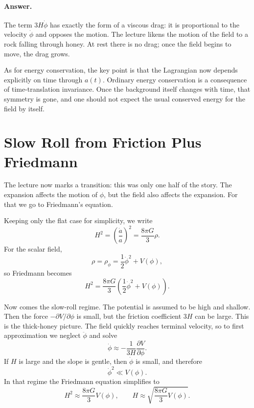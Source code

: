 \paragraph{Answer.} The term \(3H\dot{\phi}\) has exactly the form of a viscous drag: it is proportional to the velocity \(\dot{\phi}\) and opposes the motion. The lecture likens the motion of the field to a rock falling through honey. At rest there is no drag; once the field begins to move, the drag grows.

As for energy conservation, the key point is that the Lagrangian now depends explicitly on time through \(a(t)\). Ordinary energy conservation is a consequence of time-translation invariance. Once the background itself changes with time, that symmetry is gone, and one should not expect the usual conserved energy for the field by itself.

\section{Slow Roll from Friction Plus Friedmann}

The lecture now marks a transition: this was only one half of the story. The expansion affects the motion of \(\phi\), but the field also affects the expansion. For that we go to Friedmann's equation.

Keeping only the flat case for simplicity, we write
\begin{equation}
H^{2}=\left(\frac{\dot a}{a}\right)^{2}=\frac{8\pi G}{3}\rho.
\end{equation}
For the scalar field,
\begin{equation}
\rho=\rho_{\phi}=\frac{1}{2}\dot{\phi}^{2}+V(\phi),
\end{equation}
so Friedmann becomes
\begin{equation}
H^{2}=\frac{8\pi G}{3}\left(\frac{1}{2}\dot{\phi}^{2}+V(\phi)\right).
\end{equation}

Now comes the slow-roll regime. The potential is assumed to be high and shallow. Then the force \(-\partial V/\partial \phi\) is small, but the friction coefficient \(3H\) can be large. This is the thick-honey picture. The field quickly reaches terminal velocity, so to first approximation we neglect \(\ddot{\phi}\) and solve
\begin{equation}
\dot{\phi}\approx -\frac{1}{3H}\frac{\partial V}{\partial \phi}.
\end{equation}
If \(H\) is large and the slope is gentle, then \(\dot{\phi}\) is small, and therefore
\[
\dot{\phi}^{2}\ll V(\phi).
\]
In that regime the Friedmann equation simplifies to
\begin{equation}
H^{2}\approx \frac{8\pi G}{3}V(\phi),
\qquad
H\approx \sqrt{\frac{8\pi G}{3}V(\phi)}.
\end{equation}

